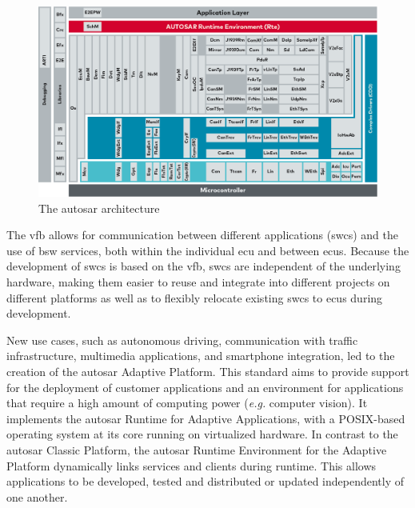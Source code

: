 \begin{figure}
    \centering
    \includegraphics[width = \linewidth]{img/parts/introduction/AUTOSAR.png}
    \caption{The \gls{autosar} architecture \citep{autosar_arch}}
    \label{fig:autosar_arch}
\end{figure}

The \gls{vfb} allows for communication between different applications (\glspl{swc}) and the use of \gls{bsw} services, both within the individual \gls{ecu} and between \glspl{ecu}. Because the development of \glspl{swc} is based on the \gls{vfb}, \glspl{swc} are independent of the underlying hardware, making them easier to reuse and integrate into different projects on different platforms as well as to flexibly relocate existing \glspl{swc} to \glspl{ecu} during development.\par

New use cases, such as autonomous driving, communication with traffic infrastructure, multimedia applications, and smartphone integration, led to the creation of the \gls{autosar} Adaptive Platform. This standard aims to provide support for the deployment of customer applications and an environment for applications that require a high amount of computing power (\textit{e.g.} computer vision). It implements the \gls{autosar} Runtime for Adaptive Applications, with a POSIX-based operating system at its core running \citep{autosar_adaptive_os} on virtualized hardware. In contrast to the \gls{autosar} Classic Platform, the \gls{autosar} Runtime Environment for the Adaptive Platform dynamically links services and clients during runtime. This allows applications to be developed, tested and distributed or updated independently of one another.

